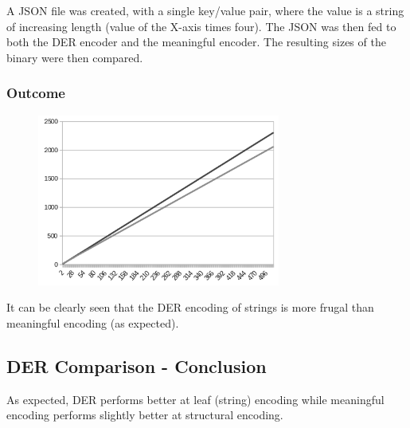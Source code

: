 A JSON file was created, with a single key/value pair, where the value
is a string of increasing length (value of the X-axis times four).
The JSON was then fed to both the DER
encoder and the meaningful encoder. The resulting sizes of the binary were
then compared.

\subsubsection{Outcome}

\begin{figure}[H]
\centering
\includegraphics[width=80mm]{stringcomparison}
\end{figure}

It can be clearly seen that the DER encoding of strings is more
frugal than meaningful encoding (as expected).

\subsection{DER Comparison - Conclusion}

As expected, DER performs better at leaf (string) encoding while
meaningful encoding performs slightly better at structural encoding.



